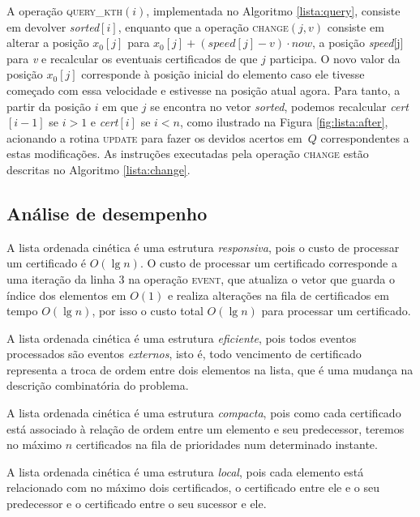 A operação \textsc{query\_kth}$(i)$, implementada no Algoritmo
\ref{lista:query}, consiste em devolver \textit{sorted}$[i]$,
enquanto que a operação \textsc{change}$(j, v)$ consiste em alterar
a posição $x_0[j]$ para $x_0[j] + (\mathit{speed}[j] - v)\cdot now$,
a posição \textit{speed}[j] para \textit{v} e recalcular os
eventuais certificados de que $j$ participa. O novo valor da posição
$x_0[j]$ corresponde à posição inicial do elemento caso ele tivesse
começado com essa velocidade e estivesse na posição atual agora.
Para tanto, a partir da posição $i$ em que $j$ se encontra no vetor
\textit{sorted}, podemos recalcular \textit{cert}$[i - 1]$ se $i >
1$ e \textit{cert}$[i]$ se $i < n$, como ilustrado na Figura
\ref{fig:lista:after}, acionando a rotina \textsc{update} para fazer
os devidos acertos em~$Q$ correspondentes a estas modificações. As
instruções executadas pela operação \textsc{change} estão descritas
no Algoritmo \ref{lista:change}.



\subsection{Análise de desempenho}

A lista ordenada cinética é uma estrutura \textit{responsiva}, pois o custo de
processar um certificado é $O(\lg{n})$. O custo de processar um certificado
corresponde a uma iteração da linha $3$ na operação \textsc{event}, que atualiza
o vetor que guarda o índice dos elementos em $O(1)$ e realiza alterações na fila
de certificados em tempo $O(\lg{n})$, por isso o custo total $O(\lg{n})$ para
processar um certificado.

A lista ordenada cinética é uma estrutura \textit{eficiente}, pois todos eventos
processados são eventos \textit{externos}, isto é, todo vencimento de
certificado representa a troca de ordem entre dois elementos na lista, que é uma
mudança na descrição combinatória do problema.

A lista ordenada cinética é uma estrutura \textit{compacta}, pois como cada
certificado está associado à relação de ordem entre um elemento e seu
predecessor, teremos no máximo $n$ certificados na fila de prioridades num
determinado instante.

A lista ordenada cinética é uma estrutura \textit{local}, pois cada elemento
está relacionado com no máximo dois certificados, o certificado entre ele e o
seu predecessor e o certificado entre o seu sucessor e ele.

